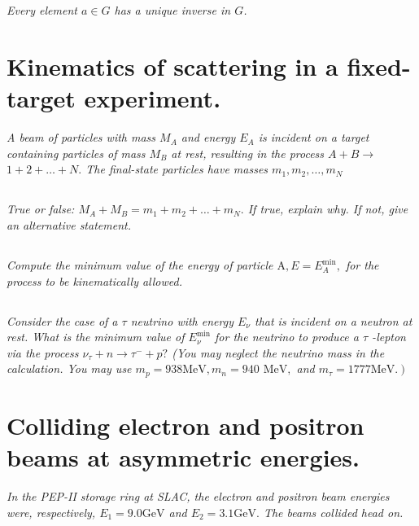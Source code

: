 \documentclass{article}
\begin{document}
\subsection{}
\textit{Every element $a \in G$ has a unique inverse in $G$.}

\newpage


\section{Kinematics of scattering in a fixed-target experiment.}
\textit{A beam of particles with mass $M_{A}$ and energy $E_{A}$ is incident on a target containing particles of mass $M_{B}$ at rest, resulting in the process $A+B \rightarrow$ $1+2+\ldots+N .$ The final-state particles have masses $m_{1}, m_{2}, \ldots, m_{N}$}
\subsection{}
\textit{True or false: $M_{A}+M_{B}=m_{1}+m_{2}+\ldots+m_{N} .$ If true, explain why. If not, give an alternative statement.}

\subsection{}
\textit{Compute the minimum value of the energy of particle $\mathrm{A}, E=E_{A}^{\min },$ for the process to be kinematically allowed.}

\subsection{}
\textit{Consider the case of a $\tau$ neutrino with energy $E_{\nu}$ that is incident on a neutron at rest. What is the minimum value of $E_{\nu}^{\min }$ for the neutrino to produce a $\tau$ -lepton via the process $\nu_{\tau}+n \rightarrow \tau^{-}+p ?$ (You may neglect the neutrino mass in the calculation. You may use $m_{p}=938 \mathrm{MeV}, m_{n}=940$ $\mathrm{MeV},$ and $\left.m_{\tau}=1777 \mathrm{MeV} .\right)$}

\newpage


\section{Colliding electron and positron beams at asymmetric energies.}
\textit{In the PEP-II storage ring at SLAC, the electron and positron beam energies were, respectively, $E_{1}=9.0 \mathrm{GeV}$ and $E_{2}=3.1 \mathrm{GeV} .$ The beams collided head on.}
\end{document}

